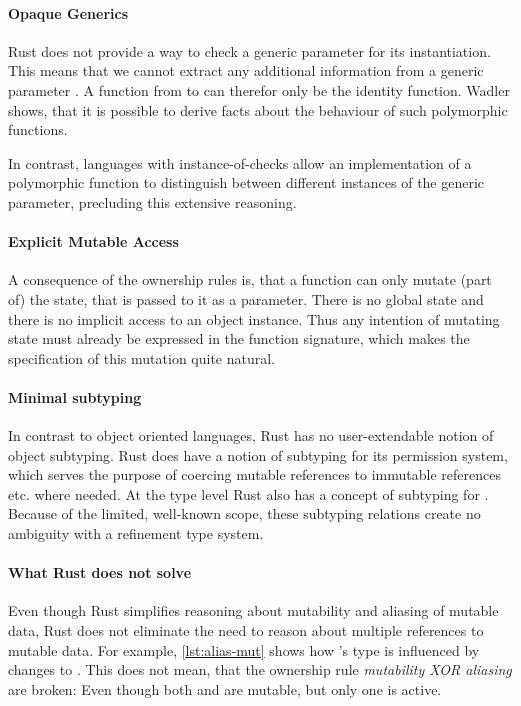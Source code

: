 \documentclass[twoside, english]{sdqthesis}
\theoremstyle{definition}
\begin{document}
\paragraph*{Opaque Generics} Rust does not provide a way to check a generic parameter for its instantiation. This means that we cannot extract any additional information from a generic parameter . A function from  to  can therefor only be the identity function.
Wadler \cite{wadler_theorems_1989} shows, that it is possible to derive facts about the behaviour of such polymorphic functions.

In contrast, languages with instance-of-checks allow an implementation of a polymorphic function to distinguish between different instances of the generic parameter, precluding this extensive reasoning.

\paragraph*{Explicit Mutable Access} A consequence of the ownership rules is, that a function can only mutate (part of) the state, that is passed to it as a parameter. There is no global state and there is no implicit access to an object instance. Thus any intention of mutating state must already be expressed in the function signature, which makes the specification of this mutation quite natural.

\paragraph*{Minimal subtyping} In contrast to object oriented languages, Rust has no user-extendable notion of object subtyping. 
Rust does have a notion of subtyping for its permission system, which serves the purpose of coercing mutable references  to immutable references  etc. where needed. 
At the type level Rust also has a concept of subtyping for .
Because of the limited, well-known scope, these subtyping relations create no ambiguity with a refinement type system.

\paragraph*{What Rust does not solve} Even though Rust simplifies reasoning about mutability and aliasing of mutable data, Rust does not eliminate the need to reason about multiple references to mutable data. For example, \cref{lst:alias-mut} shows how 's type is influenced by changes to . This does not mean, that the ownership rule  \textit{mutability XOR aliasing} are broken: Even though both  and  are mutable, but only one is active.
\end{document}
